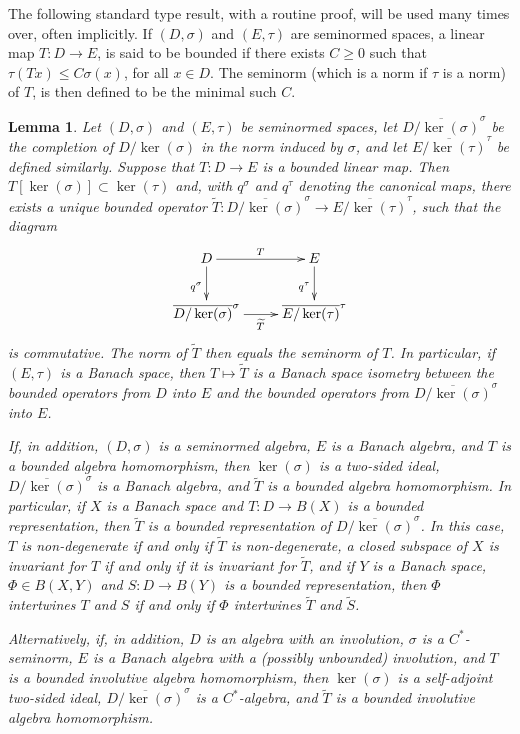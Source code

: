 \documentclass{amsart}
\theoremstyle{plain}
\newtheorem{lemma}[theorem]{Lemma}
\theoremstyle{definition}
\numberwithin{equation}{section}
\begin{document}
The following standard type result, with a routine proof, will be used many times over, often implicitly. If $(D, \sigma)$ and $(E, \tau)$ are seminormed spaces, a linear map $T: D \to E$, is said to be bounded if there exists $C \geq 0$ such that $\tau(Tx) \leq C \sigma(x)$, for all $x \in D$. The seminorm (which is a norm if $\tau$ is a norm) of $T$, is then defined to be the minimal such $C$.

\begin{lemma}\label{l:completion_associated_with_seminorm}
Let $(D,\sigma)$ and $(E, \tau)$ be seminormed spaces, let $\overline{D / \ker(\sigma)}^\sigma$ be the completion of $D / \ker(\sigma)$ in the norm induced by $\sigma$, and let $\overline{E / \ker(\tau)}^\tau$ be defined similarly. Suppose that $T:D \to E$ is a bounded linear map. Then $T[\ker(\sigma)] \subset \ker(\tau)$ and, with $q^\sigma$ and $q^\tau$ denoting the canonical maps, there exists a unique bounded operator $\widetilde{T} :\overline{D / \ker(\sigma)}^\sigma \to \overline{E / \ker(\tau)}^\tau$, such that the diagram
\begin{equation}
\xymatrix
{
D \ar[d]_{q^\sigma} \ar[r]^{T} & E \ar[d]_{q^\tau} \\
\overline{D / \ker(\sigma)}^\sigma \ar[r]_{\widetilde{T}} & \overline{E / \ker(\tau)}^\tau
}
\end{equation}
is commutative. The norm of $\widetilde{T}$ then equals the seminorm of $T$. In particular, if $(E,\tau)$ is a Banach space, then $T \mapsto \widetilde{T}$ is a Banach space isometry between the bounded operators from $D$ into $E$ and the bounded operators from $\overline{D / \ker(\sigma)}^\sigma$ into $E$.

If, in addition, $(D,\sigma)$ is a seminormed algebra, $E$ is a Banach algebra, and $T$ is a bounded algebra homomorphism, then $\ker(\sigma)$ is a two-sided ideal, $\overline{D / \ker(\sigma)}^\sigma$ is a Banach algebra, and $\widetilde{T}$ is a bounded algebra homomorphism. In particular, if $X$ is a Banach space and $T: D \to B(X)$ is a bounded representation, then $\widetilde{T}$ is a bounded representation of $\overline{D / \ker(\sigma)}^\sigma$. In this case, $T$ is non-degenerate if and only if $\widetilde{T}$ is non-degenerate, a closed subspace of $X$ is invariant for $T$ if and only if it is invariant for $\widetilde{T}$, and if $Y$ is a Banach space, $\Phi \in B(X,Y)$ and $S: D \to B(Y)$ is a bounded representation, then $\Phi$ intertwines $T$ and $S$ if and only if $\Phi$ intertwines $\widetilde{T}$ and $\widetilde{S}$.

Alternatively, if, in addition, $D$ is an algebra with an involution, $\sigma$ is a $C^*$-seminorm, $E$ is a Banach algebra with a \textup{(}possibly unbounded\textup{)} involution, and $T$ is a bounded involutive algebra homomorphism, then $\ker(\sigma)$ is a self-adjoint two-sided ideal, $\overline{D / \ker(\sigma)}^\sigma$ is a $C^*$-algebra, and $\widetilde{T}$ is a bounded involutive algebra homomorphism.
\end{lemma}
\end{document}
